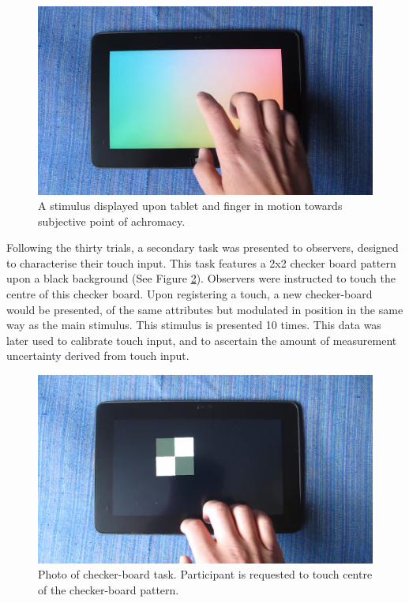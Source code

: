 \begin{figure}[hbtp]
\includegraphics[max width=\textwidth]{figs/tablet/MVI_3889-4.jpg} %
\caption{A stimulus displayed upon tablet and finger in motion towards subjective point of achromacy.}
\label{fig:finger}
\end{figure}

Following the thirty trials, a secondary task was presented to observers, designed to characterise their touch input. This task features a 2x2 checker board pattern upon a black background (See Figure \ref{fig:checker-board}). Observers were instructed to touch the centre of this checker board. Upon registering a touch, a new checker-board would be presented, of the same attributes but modulated in position in the same way as the main stimulus. This stimulus is presented 10 times. This data was later used to calibrate touch input, and to ascertain the amount of measurement uncertainty derived from touch input. %

\begin{figure}[hbtp]
\includegraphics[max width=\textwidth]{figs/tablet/checker_board.png} %
\caption{Photo of checker-board task. Participant is requested to touch centre of the checker-board pattern.}
\label{fig:checker-board}
\end{figure}

